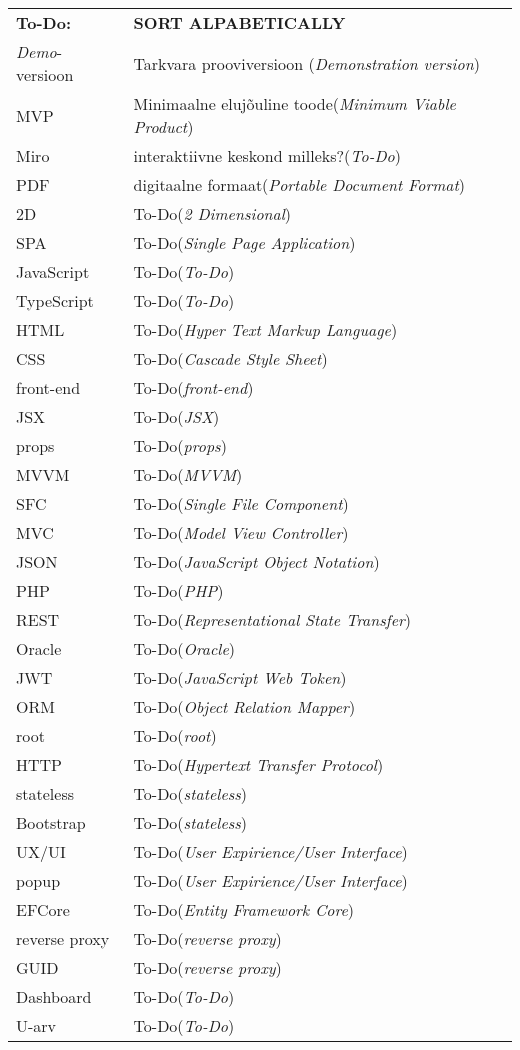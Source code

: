\begin{longtable}{p{3cm}p{10cm}}
\textbf{To-Do:}&\textbf{SORT ALPABETICALLY}\\
\textit{Demo}-versioon&Tarkvara prooviversioon (\emph{Demonstration version})\\
MVP&Minimaalne elujõuline toode(\emph{Minimum Viable Product})\\
Miro&interaktiivne keskond milleks?(\emph{To-Do})\\
PDF&digitaalne formaat(\emph{Portable Document Format})\\
2D&To-Do(\emph{2 Dimensional})\\
SPA&To-Do(\emph{Single Page Application})\\
JavaScript&To-Do(\emph{To-Do})\\
TypeScript&To-Do(\emph{To-Do})\\
HTML&To-Do(\emph{Hyper Text Markup Language})\\
CSS&To-Do(\emph{Cascade Style Sheet})\\
front-end&To-Do(\emph{front-end})\\
JSX&To-Do(\emph{JSX})\\
props&To-Do(\emph{props})\\
MVVM&To-Do(\emph{MVVM})\\
SFC&To-Do(\emph{Single File Component})\\
MVC&To-Do(\emph{Model View Controller})\\
JSON&To-Do(\emph{JavaScript Object Notation})\\
PHP&To-Do(\emph{PHP})\\
REST&To-Do(\emph{Representational State Transfer})\\
Oracle&To-Do(\emph{Oracle})\\
JWT&To-Do(\emph{JavaScript Web Token})\\
ORM&To-Do(\emph{Object Relation Mapper})\\
root&To-Do(\emph{root})\\
HTTP&To-Do(\emph{Hypertext Transfer Protocol})\\
stateless&To-Do(\emph{stateless})\\
Bootstrap&To-Do(\emph{stateless})\\
UX/UI&To-Do(\emph{User Expirience/User Interface})\\
popup&To-Do(\emph{User Expirience/User Interface})\\
EFCore&To-Do(\emph{Entity Framework Core})\\
reverse proxy&To-Do(\emph{reverse proxy})\\
GUID&To-Do(\emph{reverse proxy})\\
Dashboard&To-Do(\emph{To-Do})\\
U-arv&To-Do(\emph{To-Do})\\


\end{longtable}
\addtocounter{table}{-1} 